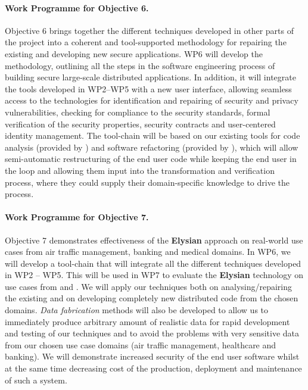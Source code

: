 \documentclass[a4paper,11pt]{article}
\newcommand{\project}[1]{\textbf{#1}\xspace}
\newcommand{\SECURITY}{\project{Elysian}}
\newcommand{\TheProject}{\SECURITY}
\begin{document}
\paragraph{Work Programme for Objective 6.} 

Objective 6  brings together the different techniques developed in other parts of the project into a coherent and tool-supported methodology for repairing the existing and developing new secure applications. WP6 will develop the methodology, outlining all the steps in the software engineering process of building secure large-scale distributed applications. In addition, it will integrate the tools developed in WP2--WP5 with a new user interface, allowing seamless access to the technologies for identification and repairing of security and privacy vulnerabilities, checking for compliance to the security standards, formal verification of the security properties, security contracts and user-centered identity management. The tool-chain will be based on our existing tools for code analysis (provided by \YAGshort{}) and software refactoring (provided by \SAshort{}), which will allow semi-automatic restructuring of the end user code while keeping the end user in the loop and allowing them input into the transformation and verification process, where they could supply their domain-specific knowledge to drive the process. %

\paragraph{Work Programme for Objective 7.} 

Objective 7 demonstrates effectiveness of the \TheProject{} approach on real-world use cases from air traffic management, %
banking and medical domains. In WP6, we will develop a tool-chain that will integrate all the different techniques developed in WP2 -- WP5. This will be used in WP7 to evaluate the \TheProject{} technology  on use cases from \SOPRAshort{} and \FRQshort{}. We will apply our techniques both on analysing/repairing the existing and on developing completely new distributed code from the chosen domains. \emph{Data fabrication} methods will also be developed to allow us to immediately produce arbitrary amount of realistic data for rapid development and testing of our techniques and to avoid the problems with very sensitive data from our chosen use case domains (air traffic management, healthcare and banking). We will demonstrate increased security of the end user software whilst at the same time decreasing cost of the production, deployment and maintenance of such a system.
\end{document}
